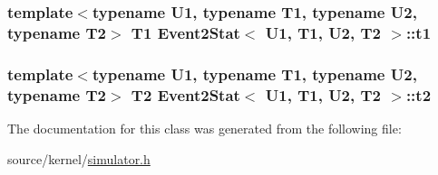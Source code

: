 \hypertarget{classEvent2Stat_5daf0d729d5a79162abdb89b4efb19c1}{
\subsubsection[{t1}]{\setlength{\rightskip}{0pt plus 5cm}template$<$typename U1, typename T1, typename U2, typename T2$>$ T1 {\bf Event2Stat}$<$ U1, T1, U2, T2 $>$::{\bf t1}}}
\label{classEvent2Stat_5daf0d729d5a79162abdb89b4efb19c1}


\hypertarget{classEvent2Stat_ebb30c7ef2db2fb567415879c49827fb}{
\subsubsection[{t2}]{\setlength{\rightskip}{0pt plus 5cm}template$<$typename U1, typename T1, typename U2, typename T2$>$ T2 {\bf Event2Stat}$<$ U1, T1, U2, T2 $>$::{\bf t2}}}
\label{classEvent2Stat_ebb30c7ef2db2fb567415879c49827fb}




The documentation for this class was generated from the following file:\begin{CompactItemize}
\item 
source/kernel/\hyperlink{simulator_8h}{simulator.h}\end{CompactItemize}
